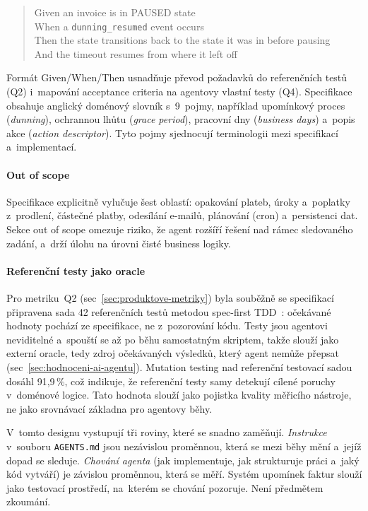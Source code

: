 \begin{quote}\small\sffamily
Given an invoice is in PAUSED state\\
When a \texttt{dunning\_resumed} event occurs\\
Then the state transitions back to the state it was in before pausing\\
And the timeout resumes from where it left off
\end{quote}

Formát Given/When/Then usnadňuje převod požadavků do referenčních
testů (\ac{Q2}) i~mapování acceptance criteria na agentovy vlastní
testy (\ac{Q4}). Specifikace obsahuje anglický doménový slovník
s~9~pojmy, například upomínkový proces (\textit{dunning}), ochrannou
lhůtu (\textit{grace period}), pracovní dny (\textit{business days})
a~popis akce (\textit{action descriptor}). Tyto pojmy sjednocují
terminologii mezi specifikací a~implementací.

\paragraph{Out of scope}
Specifikace explicitně vylučuje šest oblastí: opakování plateb,
úroky a~poplatky z~prodlení, částečné platby, odesílání e-mailů,
plánování (cron) a~persistenci dat. Sekce out of scope omezuje
riziko, že agent rozšíří řešení nad rámec sledovaného zadání,
a~drží úlohu na úrovni čisté business logiky.

\paragraph{Referenční testy jako oracle}
\label{sec:ref-implementace-postup}%
Pro metriku~\ac{Q2} (sec~\ref{sec:produktove-metriky}) byla souběžně
se specifikací připravena sada 42 referenčních testů metodou
spec-first TDD~\cite{mathews2024}: očekávané hodnoty pochází ze
specifikace, ne z~pozorování kódu. Testy jsou agentovi neviditelné
a~spouští se až po běhu samostatným skriptem, takže slouží jako
externí oracle, tedy zdroj očekávaných výsledků, který agent nemůže přepsat
(sec~\ref{sec:hodnoceni-ai-agentu}). Mutation testing nad referenční
testovací sadou dosáhl 91{,}9\,\%, což indikuje, že referenční testy samy
detekují cílené poruchy v~doménové logice. Tato hodnota slouží jako
pojistka kvality měřicího nástroje, ne jako srovnávací základna pro
agentovy běhy.

V~tomto designu vystupují tři roviny, které se snadno zaměňují.
\textit{Instrukce} v~souboru \texttt{AGENTS.md} jsou nezávislou
proměnnou, která se mezi běhy mění a~jejíž dopad se sleduje. \textit{Chování
agenta} (jak implementuje, jak strukturuje práci a~jaký kód vytváří)
je závislou proměnnou, která se měří. Systém upomínek faktur slouží
jako testovací prostředí, na~kterém se chování pozoruje. Není
předmětem zkoumání.

